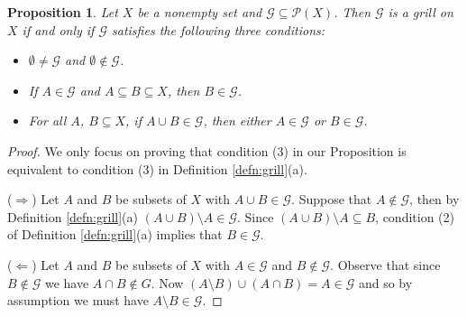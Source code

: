 \documentclass[12pt]{article}
\theoremstyle{plain}
\newtheorem{prop}[thm]{Proposition}
\theoremstyle{definition}
\newcommand{\calG}{\mathcal{G}}
\newcommand{\calP}{\mathcal{P}}
\begin{document}
\begin{prop}
  \label{prop:alt3}
  Let $X$ be a nonempty set and $\calG \subseteq \calP(X)$.
  Then $\calG$ is a grill on $X$ if and only if $\calG$ satisfies the following three conditions:
  \begin{itemize}
    \item[(1)] $\emptyset \ne \calG$ and $\emptyset \not\in \calG$.

    \item[(2)] If $A \in \calG$ and $A \subseteq B \subseteq X$, then $B \in \calG$.

    \item[(3)] For all $A$, $B \subseteq X$, if $A \cup B \in \calG$, then either $A \in \calG$ or $B \in \calG$. 
  \end{itemize}
\end{prop}
\begin{proof}
  We only focus on proving that condition (3) in our Proposition is equivalent to condition (3) in Definition \ref{defn:grill}(a).

  ($\Rightarrow$)
  Let $A$ and $B$ be subsets of $X$ with $A \cup B \in \calG$.
  Suppose that $A \not\in \calG$, then by Definition \ref{defn:grill}(a) $(A \cup B) \setminus A \in \calG$.
  Since $(A \cup B) \setminus A \subseteq B$, condition (2) of Definition \ref{defn:grill}(a) implies that $B \in \calG$.

  ($\Leftarrow$)
  Let $A$ and $B$ be subsets of $X$ with $A \in \calG$ and $B \not\in \calG$.
  Observe that since $B \not\in \calG$ we have $A \cap B \not\in G$.
  Now $(A \setminus B) \cup (A \cap B) = A \in \calG$ and so by assumption we must have $A \setminus B \in \calG$.
\end{proof}
\end{document}
